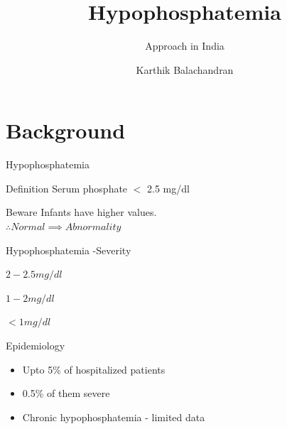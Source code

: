 \documentclass[compress]{beamer}
\author[Karthik]{Karthik Balachandran}
\title{Hypophosphatemia}
\subtitle{Approach in India}
\date{}
\institute[SRMC]{Sri Ramachandra Medical College \\ Chennai}
\newenvironment {gbar}[1]{ %
	\def \FrameCommand {{\color {#1}\vrule width 2pt}\colorbox {gray!20}} %
	\MakeFramed {\advance\hsize -\width  \FrameRestore }} %
{\endMakeFramed}
\begin{document}
\begin{frame}[plain]
	\maketitle
\end{frame}

\section{Background}
\begin{frame}{Hypophosphatemia }
\begin{block}{Definition}
	Serum phosphate $<$ 2.5 mg/dl
\end{block}
\pause
\begin{bclogo} [logo=\bcattention,barre=none,noborder=true]{Beware}
	\begin{gbar} {teal}
		Infants have higher values.\\
		$ \therefore Normal \implies Abnormality $
	\end{gbar}
\end{bclogo}

\end{frame}

\begin{frame}{ Hypophosphatemia -Severity }
	  \begin{description}[Moderate]
		\item[Mild]  $2 - 2.5 mg/dl $
		\item[Moderate]  $ 1- 2 mg/dl $
		\item[Severe]  $ < 1 mg/dl $
	\end{description}
\end{frame}
\begin{frame}{ Epidemiology }
	\begin{itemize}
		\item Upto 5\% of hospitalized patients 
		\item 0.5\% of them severe
		\item Chronic hypophosphatemia - limited data
	\end{itemize}
\end{frame} 
\end{document}
